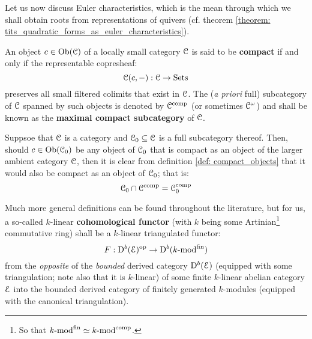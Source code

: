             Let us now discuss Euler characteristics, which is the mean through which we shall obtain roots from representations of quivers (cf. theorem \ref{theorem: tits_quadratic_forms_as_euler_characteristics}).
            \begin{definition} \label{def: compact_objects}
                An object $c \in \mathrm{Ob}(\mathcal{C})$ of a locally small category $\mathcal{C}$ is said to be \textbf{compact} if and only if the representable copresheaf:
                    $$\mathcal{C}(c, -): \mathcal{C} \to \mathrm{Sets}$$
                preserves all small filtered colimits that exist in $\mathcal{C}$. The (\textit{a priori} full) subcategory of $\mathcal{C}$ spanned by such objects is denoted by $\mathcal{C}^{\mathrm{comp}}$ (or sometimes $\mathcal{C}^{\omega}$) and shall be known as the \textbf{maximal compact subcategory} of $\mathcal{C}$. 
            \end{definition}
            \begin{remark} \label{remark: compact_objects_in_full_subcategories}
                Suppsoe that $\mathcal{C}$ is a category and $\mathcal{C}_0 \subseteq \mathcal{C}$ is a full subcategory thereof. Then, should $c \in \mathrm{Ob}(\mathcal{C}_0)$ be any object of $\mathcal{C}_0$ that is compact as an object of the larger ambient category $\mathcal{C}$, then it is clear from definition \ref{def: compact_objects} that it would also be compact as an object of $\mathcal{C}_0$; that is:
                    $$\mathcal{C}_0 \cap \mathcal{C}^{\mathrm{comp}} = \mathcal{C}_0^{\mathrm{comp}}$$
            \end{remark}
            \begin{example} \label{example: finitely_generated_modules_are_compact}
                
            \end{example}
            \begin{example} \label{example: coherent_modules_are_compact}
                
            \end{example}
            \begin{convention} \label{conv: cohomological_functors_dynkin_quiver_representations}
                Much more general definitions can be found throughout the literature, but for us, a so-called $k$-linear \textbf{cohomological functor} (with $k$ being some Artinian\footnote{So that $k\text{-}\mathrm{mod}^{\mathrm{fin}} \simeq k\text{-}\mathrm{mod}^{\mathrm{comp}}$.} commutative ring) shall be a $k$-linear triangulated functor:
                    $$F: \mathrm{D}^b(\mathcal{E})^{\mathrm{op}} \to \mathrm{D}^b(k\text{-}\mathrm{mod}^{\mathrm{fin}})$$
                from the \textit{opposite} of the \textit{bounded} derived category $\mathrm{D}^b(\mathcal{E})$ (equipped with some triangulation; note also that it is $k$-linear) of some finite $k$-linear abelian category $\mathcal{E}$ into the bounded derived category of finitely generated $k$-modules (equipped with the canonical triangulation).
            \end{convention}
